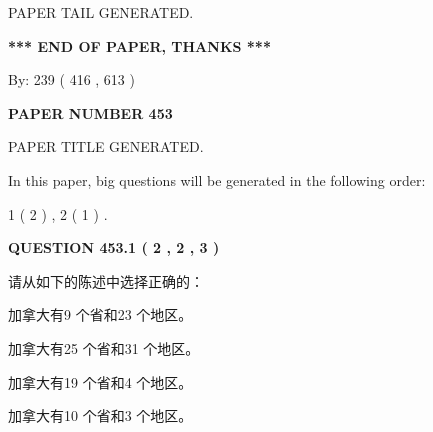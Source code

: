 \documentclass{ctexart}
\begin{document}
   
   
   
   
   
 \vspace{0.2in}
 
   
   
\vspace{2.0in} PAPER TAIL GENERATED.
   
   
   
   
\vspace{1.0in} 
{\textbf{\large{ *** END OF PAPER, THANKS *** }}} 
   
   
\hspace{1.0in} By: 
 239 ( 416 ,  613 )
   
   
   
   
\newpage 
\setcounter{page}{ 
   453001 } 
   
   
   
   
 {\textbf{ \Large{ PAPER NUMBER  453  }}}
   
   
\vspace{0.2in}
   
   
   
   
   
   
   
   
 \vspace{0.2in}
 
 
 
 
   
   
 PAPER TITLE GENERATED.
   
   
   
\vspace{0.2in}
   
In this paper, big questions will be generated in the following order: 
   
   
   1 ( 2 )
 ,
   2 ( 1 )
 .
  
\vspace{0.2in}
  
{\textbf{\Large{QUESTION
453.1 
 ( 2 , 2 , 3 )
}}}
  
  
请从如下的陈述中选择正确的：
 
 
加拿大有9 个省和23 个地区。
 
 
加拿大有25 个省和31 个地区。
 
 
加拿大有19 个省和4 个地区。
 
 
加拿大有10 个省和3 个地区。
 
\end{document}
